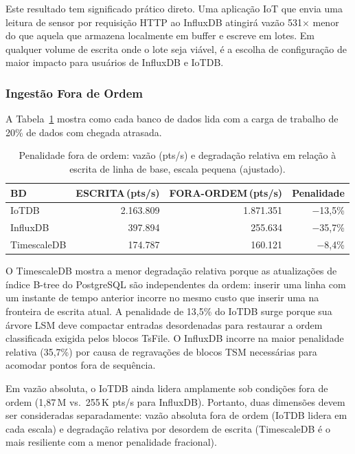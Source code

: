 Este resultado tem significado prático direto. Uma aplicação IoT que envia uma leitura de
sensor por requisição HTTP ao InfluxDB atingirá vazão 531$\times$ menor do que aquela que
armazena localmente em buffer e escreve em lotes. Em qualquer volume de escrita onde o lote
seja viável, é a escolha de configuração de maior impacto para usuários de InfluxDB e IoTDB.

\subsubsection{Ingestão Fora de Ordem}

A Tabela~\ref{tab:ooo} mostra como cada banco de dados lida com a carga de trabalho de 20\%
de dados com chegada atrasada.

\begin{table}[t]
  \centering
  \caption{Penalidade fora de ordem: vazão (pts/s) e degradação relativa em relação à escrita
  de linha de base, escala pequena (ajustado).}
  \label{tab:ooo}
  \begin{tabular}{lrrr}
    \hline
    \textbf{BD} & \textbf{ESCRITA\,(pts/s)} & \textbf{FORA-ORDEM\,(pts/s)} & \textbf{Penalidade} \\
    \hline
    IoTDB       & 2.163.809 & 1.871.351 & $-$13,5\% \\
    InfluxDB    &   397.894 &   255.634 & $-$35,7\% \\
    TimescaleDB &   174.787 &   160.121 & $-$8,4\% \\
    \hline
  \end{tabular}
\end{table}

O TimescaleDB mostra a menor degradação relativa porque as atualizações de índice B-tree do
PostgreSQL são independentes da ordem: inserir uma linha com um instante de tempo anterior
incorre no mesmo custo que inserir uma na fronteira de escrita atual. A penalidade de 13,5\%
do IoTDB surge porque sua árvore LSM deve compactar entradas desordenadas para restaurar a
ordem classificada exigida pelos blocos TsFile. O InfluxDB incorre na maior penalidade
relativa (35,7\%) por causa de regravações de blocos TSM necessárias para acomodar pontos
fora de sequência.

Em vazão absoluta, o IoTDB ainda lidera amplamente sob condições fora de ordem
(1,87\,M vs.\ 255\,K pts/s para InfluxDB). Portanto, duas dimensões devem ser consideradas
separadamente: vazão absoluta fora de ordem (IoTDB lidera em cada escala) e degradação
relativa por desordem de escrita (TimescaleDB é o mais resiliente com a menor penalidade
fracional).

